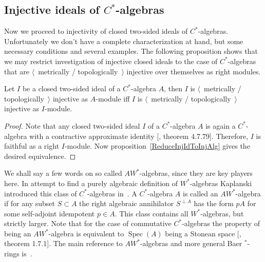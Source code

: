 
\subsection{
    Injective ideals of \texorpdfstring{$C^*$}{C*}-algebras}\label{
SubSectionInjectiveIdealsOfCStarAlgebras}

Now we proceed to injectivity of closed two-sided ideals of $C^*$-algebras.
Unfortunately we don't have a complete characterization at hand, but some
necessary conditions and several examples. The following proposition shows that
we may restrict investigation of injective closed ideals to the case of $C^*$-algebras
that are $\langle$~metrically / topologically~$\rangle$ injective over themselves as
right modules.

\begin{proposition}\label{MetTopInjOvrAlgIffOvrItslf} Let $I$ be a closed two-sided
ideal of a $C^*$-algebra $A$, then $I$ is $\langle$~metrically /
topologically~$\rangle$ injective as $A$-module iff $I$ is $\langle$~metrically
/ topologically~$\rangle$ injective as $I$-module.
\end{proposition}
\begin{proof} Note that any closed two-sided ideal $I$ of a $C^*$-algebra $A$ is again
a $C^*$-algebra with a contractive approximate identity [\cite{HelBanLocConvAlg},
theorem 4.7.79]. Therefore, $I$ is faithful as a right $I$-module. Now
proposition~\ref{ReduceInjIdToInjAlg} gives the desired equivalence.
\end{proof}

We shall say a few words on so called $AW^*$-algebras, since they are key
players here. In attempt to find a purely algebraic definition of
$W^*$-algebras Kaplanski introduced this class of $C^*$-algebras
in~\cite{KaplProjInBanAlg}. A $C^*$-algebra $A$ is called an $AW^*$-algebra if
for any subset $S\subset A$ the right algebraic annihilator
$S^{\perp A}$ has the form $pA$ for
some self-adjoint idempotent $p\in A$. This class contains all $W^*$-algebras,
but strictly larger. Note that for the case of commutative $C^*$-algebras the
property of being an $AW^*$-algebra is equivalent to  $\operatorname{Spec}(A)$
being a Stonean space [\cite{BerbBaerStarRings}, theorem 1.7.1]. The main
reference to $AW^*$-algebras and more general Baer ${}^*$-rings
is~\cite{BerbBaerStarRings}. 

